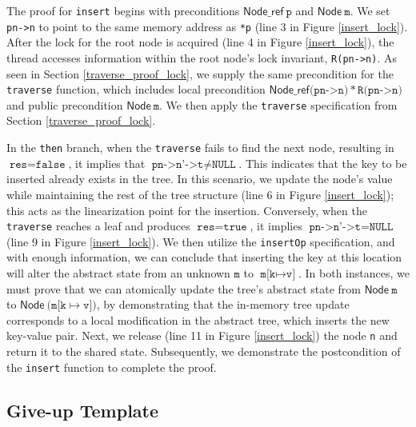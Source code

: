 \documentclass[a4paper,UKenglish,cleveref, autoref, thm-restate]{lipics-v2021}
\newcommand{\treerep}{\ensuremath{\mathsf{Node}}}
\newcommand{\nodeboxrep}{\ensuremath{\mathsf{Node\_ref}}}
\newcommand{\wm}[1]{\textbf{\textcolor{violet}{[Willam: #1]}}}
\begin{document}
The proof for \texttt{insert} begins with preconditions $\nodeboxrep \ \texttt{p}$ and $\treerep \ \texttt{m}$. We set \texttt{pn->n} to point to the same memory address as \texttt{*p} (line 3 in Figure \ref{insert_lock}). After the lock for the root node is acquired (line 4 in Figure \ref{insert_lock}), the thread accesses information within the root node's lock invariant, \texttt{R(pn->n)}. As seen in Section \ref{traverse_proof_lock}, we supply the same precondition for the \texttt{traverse} function, which includes local precondition $\nodeboxrep \texttt{(pn->n)} \ast \texttt{R(pn->n)}$ and public precondition $\treerep\ \texttt{m}$. We then apply the \texttt{traverse} specification from Section \ref{traverse_proof_lock}.

In the \texttt{then} branch, when the \texttt{traverse} fails to find the next node, resulting in $\texttt{res} = \texttt{false}$, it implies that $\texttt{pn->n'->t} \neq \texttt{NULL}$. This indicates that the key to be inserted already exists in the tree. In this scenario, we update the node's value while maintaining the rest of the tree structure (line 6 in Figure \ref{insert_lock}); this acts as the linearization point for the insertion. Conversely, when the \texttt{traverse} reaches a leaf and produces $\texttt{res} = \texttt{true}$, it implies $\texttt{pn->n'->t} = \texttt{NULL}$ (line 9 in Figure \ref{insert_lock}). We then utilize the \texttt{insertOp} specification, and with enough information, we can conclude that inserting the key at this location will alter the abstract state from an unknown $\texttt{m}$ to $\texttt{m[k} \mapsto \texttt{v]}$. In both instances, we must prove that we can atomically update the tree's abstract state from $\treerep \ \texttt{m}$ to $\treerep\ (\texttt{m[k} \mapsto \texttt{v])}$, by demonstrating that the in-memory tree update corresponds to a local modification in the abstract tree, which inserts the new key-value pair. 
Next, we release (line 11 in Figure \ref{insert_lock}) the node \texttt{n} and return it to the shared state. Subsequently, we demonstrate the postcondition of the \texttt{insert} function to complete the proof.


\subsection{Give-up Template}
\end{document}
